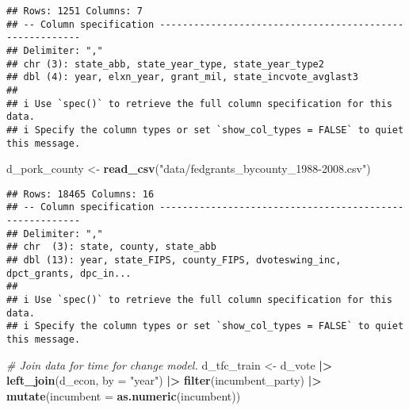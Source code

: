 \documentclass[
]{article}
\newenvironment{Shaded}{\begin{snugshade}}{\end{snugshade}}
\newcommand{\AttributeTok}[1]{\textcolor[rgb]{0.13,0.29,0.53}{#1}}
\newcommand{\CommentTok}[1]{\textcolor[rgb]{0.56,0.35,0.01}{\textit{#1}}}
\newcommand{\FunctionTok}[1]{\textcolor[rgb]{0.13,0.29,0.53}{\textbf{#1}}}
\newcommand{\NormalTok}[1]{#1}
\newcommand{\OtherTok}[1]{\textcolor[rgb]{0.56,0.35,0.01}{#1}}
\newcommand{\SpecialCharTok}[1]{\textcolor[rgb]{0.81,0.36,0.00}{\textbf{#1}}}
\newcommand{\StringTok}[1]{\textcolor[rgb]{0.31,0.60,0.02}{#1}}
\begin{document}
\begin{verbatim}
## Rows: 1251 Columns: 7
## -- Column specification --------------------------------------------------------
## Delimiter: ","
## chr (3): state_abb, state_year_type, state_year_type2
## dbl (4): year, elxn_year, grant_mil, state_incvote_avglast3
## 
## i Use `spec()` to retrieve the full column specification for this data.
## i Specify the column types or set `show_col_types = FALSE` to quiet this message.
\end{verbatim}

\begin{Shaded}
\begin{Highlighting}[]
\NormalTok{d\_pork\_county }\OtherTok{\textless{}{-}} \FunctionTok{read\_csv}\NormalTok{(}\StringTok{"data/fedgrants\_bycounty\_1988{-}2008.csv"}\NormalTok{)}
\end{Highlighting}
\end{Shaded}

\begin{verbatim}
## Rows: 18465 Columns: 16
## -- Column specification --------------------------------------------------------
## Delimiter: ","
## chr  (3): state, county, state_abb
## dbl (13): year, state_FIPS, county_FIPS, dvoteswing_inc, dpct_grants, dpc_in...
## 
## i Use `spec()` to retrieve the full column specification for this data.
## i Specify the column types or set `show_col_types = FALSE` to quiet this message.
\end{verbatim}

\begin{Shaded}
\begin{Highlighting}[]
\CommentTok{\# Join data for time for change model.}
\NormalTok{d\_tfc\_train }\OtherTok{\textless{}{-}}\NormalTok{ d\_vote }\SpecialCharTok{|\textgreater{}} 
  \FunctionTok{left\_join}\NormalTok{(d\_econ, }\AttributeTok{by =} \StringTok{"year"}\NormalTok{) }\SpecialCharTok{|\textgreater{}} 
  \FunctionTok{filter}\NormalTok{(incumbent\_party) }\SpecialCharTok{|\textgreater{}}
  \FunctionTok{mutate}\NormalTok{(}\AttributeTok{incumbent =} \FunctionTok{as.numeric}\NormalTok{(incumbent))}
\end{Highlighting}
\end{Shaded}
\end{document}
